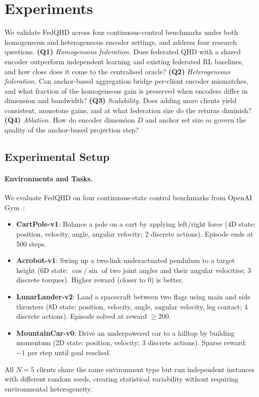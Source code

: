 \section{Experiments}
\label{sec:experiments}

We validate FedQHD across four continuous-control benchmarks under both homogeneous and heterogeneous encoder settings, and address four research questions.
\textbf{(Q1)} \emph{Homogeneous federation.}
Does federated QHD with a shared encoder outperform independent learning and existing federated RL baselines, and how close does it come to the centralised oracle?
\textbf{(Q2)} \emph{Heterogeneous federation.}
Can anchor-based aggregation bridge per-client encoder mismatches, and what fraction of the homogeneous gain is preserved when encoders differ in dimension and bandwidth?
\textbf{(Q3)} \emph{Scalability.}
Does adding more clients yield consistent, monotone gains, and at what federation size do the returns diminish?
\textbf{(Q4)} \emph{Ablation.}
How do encoder dimension $D$ and anchor set size $m$ govern the quality of the anchor-based projection step?

\subsection{Experimental Setup}
\label{subsec:exp_setup}

\paragraph{Environments and Tasks.}
We evaluate FedQHD on four continuous-state control benchmarks from OpenAI Gym~\cite{brockman2016openai}:
\begin{itemize}
    \item \textbf{CartPole-v1}: Balance a pole on a cart by applying left/right force (4D state: position, velocity, angle, angular velocity; 2 discrete actions). Episode ends at 500 steps.
    \item \textbf{Acrobot-v1}: Swing up a two-link underactuated pendulum to a target height (6D state: $\cos/\sin$ of two joint angles and their angular velocities; 3 discrete torques). Higher reward (closer to 0) is better.
    \item \textbf{LunarLander-v2}: Land a spacecraft between two flags using main and side thrusters (8D state: position, velocity, angle, angular velocity, leg contact; 4 discrete actions). Episode solved at reward $\geq 200$.
    \item \textbf{MountainCar-v0}: Drive an underpowered car to a hilltop by building momentum (2D state: position, velocity; 3 discrete actions). Sparse reward: $-1$ per step until goal reached.
\end{itemize}
All $N=5$ clients share the same environment type but run independent instances with different random seeds, creating statistical variability without requiring environmental heterogeneity.

